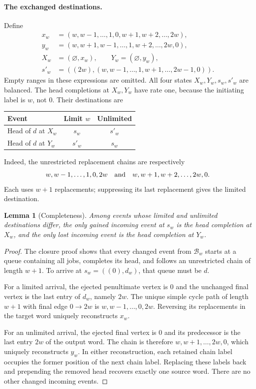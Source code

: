 \documentclass[11pt]{article}
\newtheorem{lemma}[theorem]{Lemma}
\theoremstyle{remark}
\newcommand{\B}{\mathcal B_w}
\newcommand{\emptyq}{\varnothing}
\begin{document}
\paragraph{The exchanged destinations.}
Define
\begin{align*}
 x_w&=(w,w-1,\ldots,1,0,w+1,w+2,\ldots,2w),\\
 y_w&=(w,w+1,w-1,\ldots,1,w+2,\ldots,2w,0),\\
 X_w&=(\emptyq,x_w),\qquad Y_w=(\emptyq,y_w),\\
 s'_w&=((2w),(w,w-1,\ldots,1,w+1,\ldots,2w-1,0)).
\end{align*}
Empty ranges in these expressions are omitted. All four states $X_w,Y_w,s_w,s'_w$ are balanced. The head completions at $X_w,Y_w$ have rate one, because the initiating label is $w$, not $0$. Their destinations are
\begin{center}
\begin{tabular}{lcc}
\toprule
Event & Limit $w$ & Unlimited\\
\midrule
Head of $d$ at $X_w$ & $s_w$ & $s'_w$\\
Head of $d$ at $Y_w$ & $s'_w$ & $s_w$\\
\bottomrule
\end{tabular}
\end{center}
Indeed, the unrestricted replacement chains are respectively
\[
 w,w-1,\ldots,1,0,2w
 \quad\hbox{and}\quad
 w,w+1,w+2,\ldots,2w,0.
\]
Each uses $w+1$ replacements; suppressing its last replacement gives the limited destination.

\begin{lemma}[Completeness]\label{lem:two}
Among events whose limited and unlimited destinations differ, the only gained incoming event at $s_w$ is the head completion at $X_w$, and the only lost incoming event is the head completion at $Y_w$.
\end{lemma}
\begin{proof}
The closure proof shows that every changed event from $\B$ starts at a queue containing all jobs, completes its head, and follows an unrestricted chain of length $w+1$. To arrive at $s_w=((0),d_w)$, that queue must be $d$.

For a limited arrival, the ejected penultimate vertex is $0$ and the unchanged final vertex is the last entry of $d_w$, namely $2w$. The unique simple cycle path of length $w+1$ with final edge $0\to2w$ is $w,w-1,\ldots,0,2w$. Reversing its replacements in the target word uniquely reconstructs $x_w$.

For an unlimited arrival, the ejected final vertex is $0$ and its predecessor is the last entry $2w$ of the output word. The chain is therefore $w,w+1,\ldots,2w,0$, which uniquely reconstructs $y_w$. In either reconstruction, each retained chain label occupies the former position of the next chain label. Replacing these labels back and prepending the removed head recovers exactly one source word. There are no other changed incoming events.
\end{proof}
\end{document}
